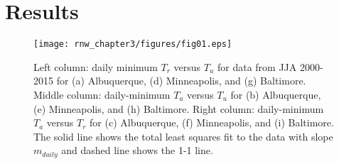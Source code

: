 {%


\section{Results}


\begin{figure}
\texttt{[image: rnw\_chapter3/figures/fig01.eps]} 
\caption{Left column: daily minimum 
$T_r$ versus 
$T_u$ for data from JJA 2000-2015 for 
(a) Albuquerque, (d) Minneapolis, and (g) Baltimore. Middle column: daily-minimum $T_a$ versus $T_u$ for 
(b) Albuquerque, (e) Minneapolis, and (h) Baltimore.
Right column: daily-minimum $T_a$ versus $T_r$ for 
(c) Albuquerque, (f) Minneapolis, and (i) Baltimore.
The solid line shows the total least squares fit to the data with slope $m_{daily}$ and dashed line shows the 1-1 line.  
}
\label{fig:jja4}
\end{figure}

}
